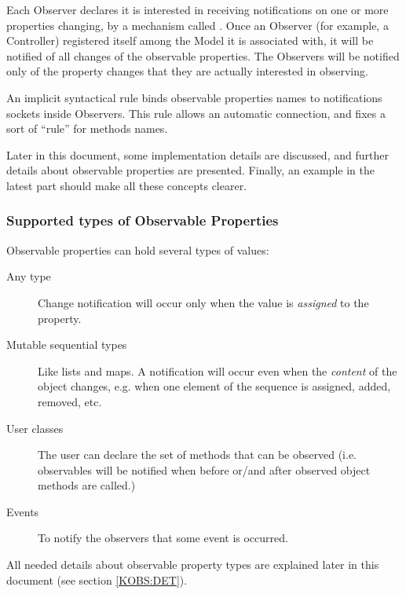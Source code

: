 Each Observer declares it is interested in receiving notifications on
one or more properties changing, by a mechanism called
. Once an Observer (for example, a Controller)
registered itself among the Model it is associated with, it will be
notified of all changes of the observable properties. The Observers
will be notified only of the property changes that they are actually
interested in observing.

An implicit syntactical rule binds observable properties names to
notifications sockets inside Observers. This rule allows an automatic
connection, and fixes a sort of ``rule'' for methods names.

Later in this document, some implementation details are discussed, and
further details about observable properties are presented. Finally,
an example in the latest part should make all these concepts clearer.


\subsubsection{\label{KOBS} Supported types of Observable Properties}

Observable properties can hold several types of values:

\begin{description}
\item [Any type] Change notification will occur only when the value is
  \emph{assigned} to the property.

\item [Mutable sequential types] Like lists and maps. A notification
  will occur even when the \emph{content} of the object changes, e.g.
  when one element of the sequence is assigned, added, removed, etc.
 
\item [User classes] The user can declare the set of methods that can
  be observed (i.e. observables will be notified when before or/and
  after observed object methods are called.) 

\item [Events] To notify the observers that some event is occurred.
\end{description}

All needed details about observable property types are explained later
in this document (see section \ref{KOBS:DET}).
